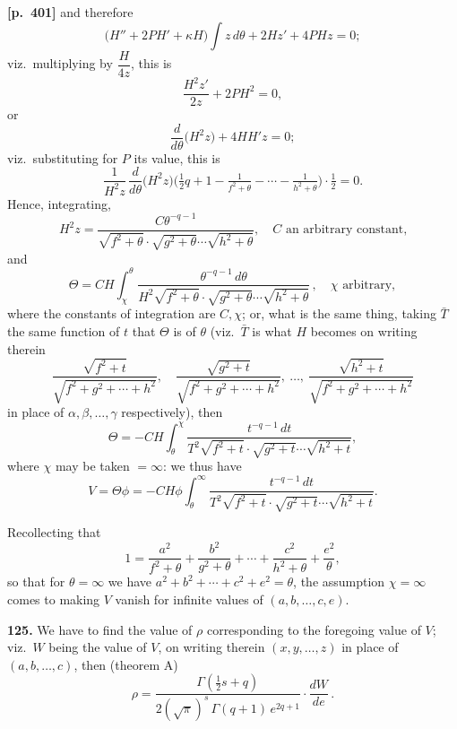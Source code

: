 \documentclass[11pt,a4paper]{article}
\begin{document}
\noindent\textbf{[p.~401]}\quad
and therefore
\[
\bigl(H'' + 2P H' + \kappa H\bigr)\int z\,d\theta + 2 H z' + 4 P H z = 0;
\]
viz.\ multiplying by $\dfrac{H}{4 z}$, this is
\[
\frac{H^{2} z'}{2 z} + 2 P H^{2} = 0,
\]
or
\[
\frac{d}{d\theta}\bigl(H^{2} z\bigr) + 4 H H' z = 0;
\]
viz.\ substituting for $P$ its value, this is
\[
\frac{1}{H^{2} z}\,\frac{d}{d\theta}\bigl(H^{2} z\bigr)\bigl(\tfrac{1}{2}q + 1 - \tfrac{1}{f^{2}+\theta} - \cdots - \tfrac{1}{h^{2}+\theta}\bigr)\cdot\tfrac{1}{2} = 0.
\]
Hence, integrating,
\[
H^{2} z = \frac{C\theta^{-q-1}}{\sqrt{f^{2}+\theta}\cdot\sqrt{g^{2}+\theta}\cdots\sqrt{h^{2}+\theta}},\quad C\text{ an arbitrary constant,}
\]
and
\[
\Theta = C H\int_{\chi}^{\theta}\frac{\theta^{-q-1}\,d\theta}{H^{2}\sqrt{f^{2}+\theta}\cdot\sqrt{g^{2}+\theta}\cdots\sqrt{h^{2}+\theta}}\,,\quad \chi\text{ arbitrary},
\]
where the constants of integration are $C, \chi$; or, what is the same thing, taking $\bar{T}$ the same function of $t$ that $\Theta$ is of $\theta$ (viz.\ $\bar{T}$ is what $H$ becomes on writing therein
\[
\frac{\sqrt{f^{2}+t}}{\sqrt{f^{2}+g^{2}+\cdots+h^{2}}},\quad \frac{\sqrt{g^{2}+t}}{\sqrt{f^{2}+g^{2}+\cdots+h^{2}}},\ \ldots,\ \frac{\sqrt{h^{2}+t}}{\sqrt{f^{2}+g^{2}+\cdots+h^{2}}}
\]
in place of $\alpha, \beta, \ldots, \gamma$ respectively), then
\[
\Theta = -C H\int_{\theta}^{\chi}
\frac{t^{-q-1}\,dt}{T^{2}\sqrt{f^{2}+t}\cdot\sqrt{g^{2}+t}\cdots\sqrt{h^{2}+t}},
\]
where $\chi$ may be taken $= \infty$: we thus have
\[
V = \Theta\phi = -C H\phi\int_{\theta}^{\infty}
\frac{t^{-q-1}\,dt}{T^{2}\sqrt{f^{2}+t}\cdot\sqrt{g^{2}+t}\cdots\sqrt{h^{2}+t}}.
\]

Recollecting that
\[
1 = \frac{a^{2}}{f^{2}+\theta} + \frac{b^{2}}{g^{2}+\theta} + \cdots + \frac{c^{2}}{h^{2}+\theta} + \frac{e^{2}}{\theta},
\]
so that for $\theta = \infty$ we have $a^{2} + b^{2} + \cdots + c^{2} + e^{2} = \theta$, the assumption $\chi = \infty$ comes to making $V$ vanish for infinite values of $(a, b, \ldots, c, e)$.

\textbf{125.} We have to find the value of $\rho$ corresponding to the foregoing value of $V$; viz.\ $W$ being the value of $V$, on writing therein $(x, y, \ldots, z)$ in place of $(a, b, \ldots, c)$, then (theorem A)
\[
\rho = \frac{\Gamma(\tfrac{1}{2}s + q)}{2(\sqrt{\pi})^{s}\,\Gamma(q+1)\,e^{2q+1}}\cdot\frac{dW}{de}\,.
\]
\end{document}
